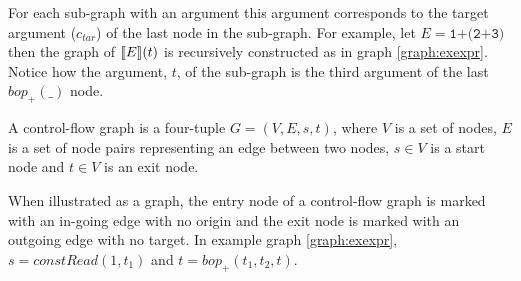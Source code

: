 For each sub-graph with an argument this argument corresponds to the target argument ($c_{tar}$) of the last node in the sub-graph. For example, let $E = \texttt{1+(2+3)}$ then the graph of $\llbracket E\rrbracket(t)$ is recursively constructed as in graph \ref{graph:exexpr}. Notice how the argument, $t$, of the sub-graph is the third argument of the last $\mathit{bop}_+(\_)$ node.

\begin{definition}
\label{def:cfg}
A control-flow graph is a four-tuple $G = (V, E, s, t)$, where $V$ is a set of nodes, $E$ is a set of node pairs representing an edge between two nodes, $s\in V$ is a start node and $t\in V$ is an exit node.
\end{definition}

When illustrated as a graph, the entry node of a control-flow graph is marked with an in-going edge with no origin and the exit node is marked with an outgoing edge with no target. In example graph \ref{graph:exexpr}, $s = \mathit{constRead}(1, t_1)$ and $t = \mathit{bop}_+(t_1, t_2, t)$.

